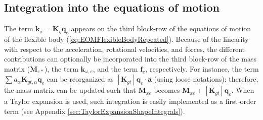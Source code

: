 \documentclass[wes, manuscript]{copernicus}
\renewcommand{\v}[1]{\boldsymbol{#1}}
\newcommand{\m}[1]{\boldsymbol{#1}}
\begin{document}





\subsection{Integration into the equations of motion}
The term $\v{k}_\sigma = \m{K}_g \v{q}_e$ appears on the third block-row of the equations of motion of the flexible body (\autoref{eq:EOMFlexibleBodyRepeated}).
Because of the linearity with respect to the acceleration, rotational velocities, and forces, the different contributions can optionally be incorporated into the third block-row of the mass matrix ($\m{M}_{e*}$), the term $\v{k}_{\omega,e}$, and the term $\v{f}_e$, respectively. For instance, the term $\sum a_\alpha \m{K}_{gt,\alpha} \v{q}_e$ can be reorganized as $[\m{K}_{gt}]\v{q}_e \cdot \v{a}$ (using loose notations); therefore, the mass matrix can be updated such that $\m{M}_{xe}$ becomes $\m{M}_{xe}+[\m{K}_{gt}]\v{q}_e$. When a Taylor expansion is used, such integration is easily implemented as a first-order term (see Appendix \ref{sec:TaylorExpansionShapeIntegrals}).
\end{document}
